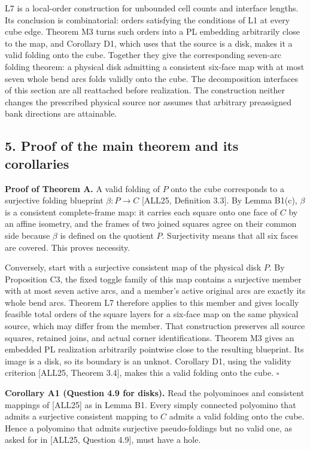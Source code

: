 \documentclass[
  11pt,
]{article}
\begin{document}
L7 is a local-order construction for unbounded cell counts and interface
lengths. Its conclusion is combinatorial: orders satisfying the
conditions of L1 at every cube edge. Theorem M3 turns such orders into a
PL embedding arbitrarily close to the map, and Corollary D1, which uses
that the source is a disk, makes it a valid folding onto the cube.
Together they give the corresponding seven-arc folding theorem: a
physical disk admitting a consistent six-face map with at most seven
whole bend arcs folds validly onto the cube. The decomposition
interfaces of this section are all reattached before realization. The
construction neither changes the prescribed physical source nor assumes
that arbitrary preassigned bank directions are attainable.

\subsection{5. Proof of the main theorem and its
corollaries}\label{proof-of-the-main-theorem-and-its-corollaries}

\textbf{Proof of Theorem A.} A valid folding of \(P\) onto the cube
corresponds to a surjective folding blueprint \(\beta:P\to C\) {[}ALL25,
Definition 3.3{]}. By Lemma B1(c), \(\beta\) is a consistent
complete-frame map: it carries each square onto one face of \(C\) by an
affine isometry, and the frames of two joined squares agree on their
common side because \(\beta\) is defined on the quotient \(P\).
Surjectivity means that all six faces are covered. This proves
necessity.

Conversely, start with a surjective consistent map of the physical disk
\(P\). By Proposition C3, the fixed toggle family of this map contains a
surjective member with at most seven active arcs, and a member's active
original arcs are exactly its whole bend arcs. Theorem L7 therefore
applies to this member and gives locally feasible total orders of the
square layers for a six-face map on the same physical source, which may
differ from the member. That construction preserves all source squares,
retained joins, and actual corner identifications. Theorem M3 gives an
embedded PL realization arbitrarily pointwise close to the resulting
blueprint. Its image is a disk, so its boundary is an unknot. Corollary
D1, using the validity criterion {[}ALL25, Theorem 3.4{]}, makes this a
valid folding onto the cube. \(\square\)

\textbf{Corollary A1 (Question 4.9 for disks).} Read the polyominoes and
consistent mappings of {[}ALL25{]} as in Lemma B1. Every simply
connected polyomino that admits a surjective consistent mapping to \(C\)
admits a valid folding onto the cube. Hence a polyomino that admits
surjective pseudo-foldings but no valid one, as asked for in {[}ALL25,
Question 4.9{]}, must have a hole.
\end{document}
